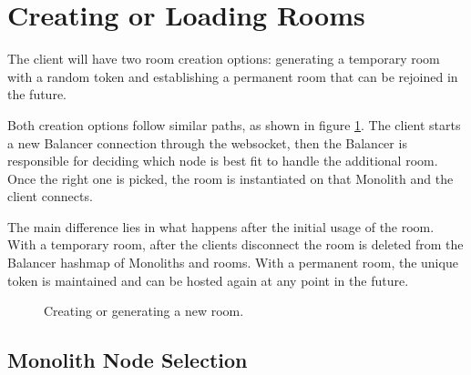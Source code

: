 \section{Creating or Loading Rooms}

The client will have two room creation options: generating a temporary room with a random token and establishing a permanent room that can be rejoined in the future. 

Both creation options follow similar paths, as shown in figure \ref{Figure::create-room-diag}. The client starts a new Balancer connection through the websocket, then the Balancer is responsible for deciding which node is best fit to handle the additional room. Once the right one is picked, the room is instantiated on that Monolith and the client connects.

The main difference lies in what happens after the initial usage of the room. With a temporary room, after the clients disconnect the room is deleted from the Balancer hashmap of Monoliths and rooms. With a permanent room, the unique token is maintained and can be hosted again at any point in the future.

\begin{figure}[!htb]
  \centering
  \caption{\label{Figure::create-room-diag} Creating or generating a new room.}
\end{figure}

\subsection{Monolith Node Selection}
